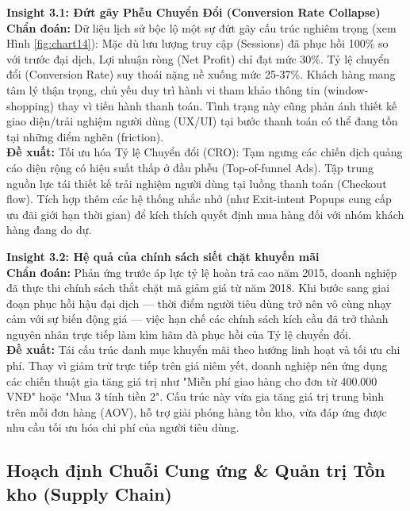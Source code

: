 \documentclass{article}
\begin{document}
\textbf{Insight 3.1: Đứt gãy Phễu Chuyển Đổi (Conversion Rate Collapse)} \\
\textbf{Chẩn đoán:} Dữ liệu lịch sử bộc lộ một sự đứt gãy cấu trúc nghiêm trọng (xem Hình \ref{fig:chart14}): Mặc dù lưu lượng truy cập (Sessions) đã phục hồi 100\% so với trước đại dịch, Lợi nhuận ròng (Net Profit) chỉ đạt mức 30\%. Tỷ lệ chuyển đổi (Conversion Rate) suy thoái nặng nề xuống mức 25-37\%. Khách hàng mang tâm lý thận trọng, chủ yếu duy trì hành vi tham khảo thông tin (window-shopping) thay vì tiến hành thanh toán. Tình trạng này cũng phản ánh thiết kế giao diện/trải nghiệm người dùng (UX/UI) tại bước thanh toán có thể đang tồn tại những điểm nghẽn (friction).
\\
\textbf{Đề xuất:} Tối ưu hóa Tỷ lệ Chuyển đổi (CRO): Tạm ngưng các chiến dịch quảng cáo diện rộng có hiệu suất thấp ở đầu phễu (Top-of-funnel Ads). Tập trung nguồn lực tái thiết kế trải nghiệm người dùng tại luồng thanh toán (Checkout flow). Tích hợp thêm các hệ thống nhắc nhở (như Exit-intent Popups cung cấp ưu đãi giới hạn thời gian) để kích thích quyết định mua hàng đối với nhóm khách hàng đang do dự.

\textbf{Insight 3.2: Hệ quả của chính sách siết chặt khuyến mãi} \\
\textbf{Chẩn đoán:} Phản ứng trước áp lực tỷ lệ hoàn trả cao năm 2015, doanh nghiệp đã thực thi chính sách thắt chặt mã giảm giá từ năm 2018. Khi bước sang giai đoạn phục hồi hậu đại dịch — thời điểm người tiêu dùng trở nên vô cùng nhạy cảm với sự biến động giá — việc hạn chế các chính sách kích cầu đã trở thành nguyên nhân trực tiếp làm kìm hãm đà phục hồi của Tỷ lệ chuyển đổi.
\\
\textbf{Đề xuất:} Tái cấu trúc danh mục khuyến mãi theo hướng linh hoạt và tối ưu chi phí. Thay vì giảm trừ trực tiếp trên giá niêm yết, doanh nghiệp nên ứng dụng các chiến thuật gia tăng giá trị như "Miễn phí giao hàng cho đơn từ 400.000 VNĐ" hoặc "Mua 3 tính tiền 2". Cấu trúc này vừa gia tăng giá trị trung bình trên mỗi đơn hàng (AOV), hỗ trợ giải phóng hàng tồn kho, vừa đáp ứng được nhu cầu tối ưu hóa chi phí của người tiêu dùng.

\subsection{Hoạch định Chuỗi Cung ứng \& Quản trị Tồn kho (Supply Chain)}
\end{document}
